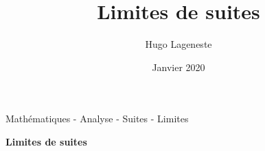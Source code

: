 \documentclass{article}
\title{Limites de suites}
\author{Hugo Lageneste}
\date{Janvier 2020}
\begin{document}
{Mathématiques - Analyse - Suites - Limites}%

\begin{center}
    \newcommand{\HRule}{\rule{\linewidth}{0.5mm}}
    {\huge \bfseries Limites de suites}\\[0.1cm] 
\end{center}
\end{document}
